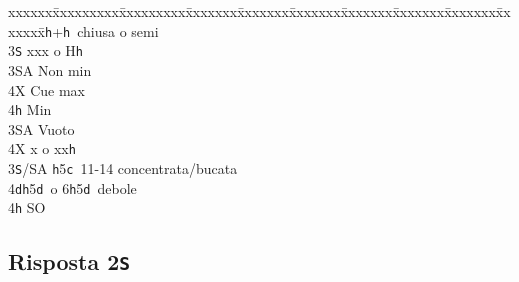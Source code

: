\documentclass[a4paper,italian]{article}
\newcommand{\BS}{\small{\texttt{S}}}
\newcommand{\BC}{\small{\texttt{c}}}
\newcommand{\BD}{\small{\texttt{d}}}
\newcommand{\BH}{\small{\texttt{h}}}
\newcommand{\pdfs}{\texorpdfstring{\texttt{S}}{S}}
\newenvironment{bidtable}
{\begin{tabbing}

    xxxxxx\=xxxxxxxxx\=xxxxxxxxx\=xxxxxxx\=xxxxxxx\=xxxxxxx\=xxxxxxx\=xxxxxxx\=xxxxxxx\=xxxxxxx\=\kill}
{\end{tabbing} }%
\begin{document}
\begin{multicols}{2}
\begin{bidtable}
        3\BH {}+\BH\ chiusa o semi\+\\
        3\BS \> xxx o H\BH \+\\
        3\small{SA} \> Non min\\
        4X \> Cue max\\
        4\BH \> Min\-\\
        3\small{SA} \> Vuoto\\
        4X \> x o xx\BH \-\\
        3\BS/SA \BH 5\BC\ 11-14 concentrata/bucata\\
        4\BD {}\BH5\BD\ o 6\BH5\BD\ debole\+\\
        4\BH \> SO
    \end{bidtable}
\end{multicols}

\newpage

\subsection{Risposta 2\pdfs}
\end{document}
